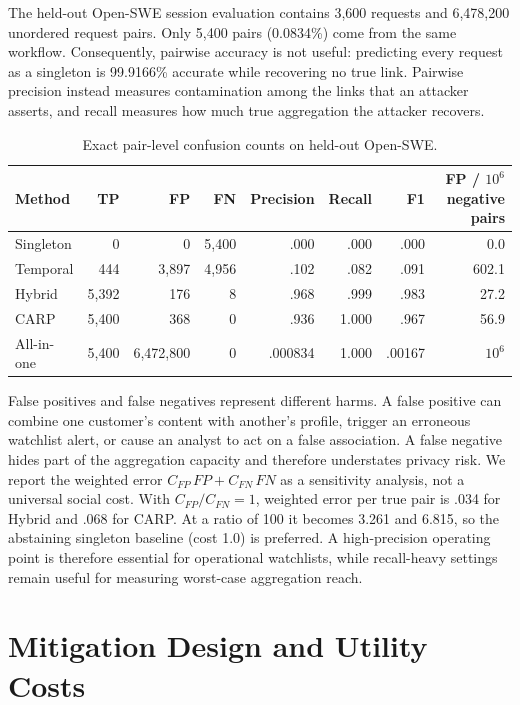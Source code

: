 \documentclass[letterpaper]{article} %
\begin{document}
The held-out Open-SWE session evaluation contains 3,600 requests and 6,478,200 unordered request
pairs. Only 5,400 pairs (0.0834\%) come from the same workflow. Consequently, pairwise accuracy is
not useful: predicting every request as a singleton is 99.9166\% accurate while recovering no true
link. Pairwise precision instead measures contamination among the links that an attacker asserts,
and recall measures how much true aggregation the attacker recovers.

\begin{table}[t]
\centering
\small
\begin{tabular}{@{}lrrrrrrr@{}}
\toprule
Method & TP & FP & FN & Precision & Recall & F1 & FP / $10^6$ negative pairs \\
\midrule
Singleton & 0 & 0 & 5,400 & .000 & .000 & .000 & 0.0 \\
Temporal & 444 & 3,897 & 4,956 & .102 & .082 & .091 & 602.1 \\
Hybrid & 5,392 & 176 & 8 & .968 & .999 & .983 & 27.2 \\
CARP & 5,400 & 368 & 0 & .936 & 1.000 & .967 & 56.9 \\
All-in-one & 5,400 & 6,472,800 & 0 & .000834 & 1.000 & .00167 & $10^6$ \\
\bottomrule
\end{tabular}
\caption{Exact pair-level confusion counts on held-out Open-SWE.}
\end{table}

False positives and false negatives represent different harms. A false positive can combine one
customer's content with another's profile, trigger an erroneous watchlist alert, or cause an analyst
to act on a false association. A false negative hides part of the aggregation capacity and therefore
understates privacy risk. We report the weighted error
$C_{FP}\,FP+C_{FN}\,FN$ as a sensitivity analysis, not a universal social cost. With
$C_{FP}/C_{FN}=1$, weighted error per true pair is .034 for Hybrid and .068 for CARP. At a ratio of
100 it becomes 3.261 and 6.815, so the abstaining singleton baseline (cost 1.0) is preferred. A
high-precision operating point is therefore essential for operational watchlists, while recall-heavy
settings remain useful for measuring worst-case aggregation reach.

\section{Mitigation Design and Utility Costs}
\end{document}
